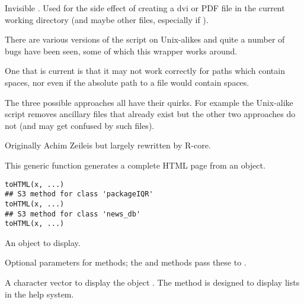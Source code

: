 %
\begin{Value}
Invisible .  Used for the side effect of creating a dvi or
PDF file in the current working directory (and maybe other files,
especially if ). 
\end{Value}
%
\begin{Note}\relax
There are various versions of the  script on
Unix-alikes and quite a number of bugs have been seen, some of which
this \R{} wrapper works around.

One that is current is that it may not work correctly for paths which
contain spaces, nor even if the absolute path to a file would contain
spaces.

The three possible approaches all have their quirks.  For example the
Unix-alike  script removes ancillary files that already
exist but the other two approaches do not (and may get confused by
such files). 
\end{Note}
%
\begin{Author}\relax
Originally Achim Zeileis but largely rewritten by R-core.
\end{Author}
%
\begin{Description}\relax
This generic function generates a complete HTML page from an object.
\end{Description}
%
\begin{Usage}
\begin{verbatim}
toHTML(x, ...)
## S3 method for class 'packageIQR'
toHTML(x, ...)
## S3 method for class 'news_db'
toHTML(x, ...)
\end{verbatim}
\end{Usage}
%
\begin{Arguments}
\begin{ldescription}
\item[\code{x}]  An object to display. 
\item[\code{...}]  Optional parameters for methods; the  and
 methods pass these to . 
\end{ldescription}
\end{Arguments}
%
\begin{Value}
A character vector to display the object .  The  method
is designed to display lists in the \R{} help system.
\end{Value}
